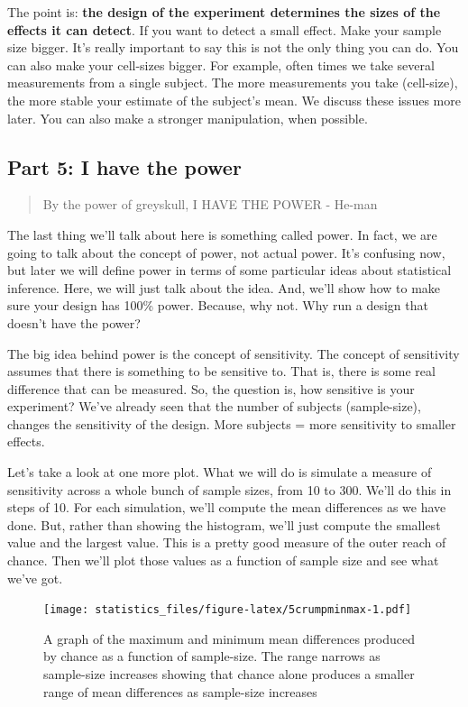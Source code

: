 \documentclass[]{book}
\begin{document}
The point is: \textbf{the design of the experiment determines the sizes of the effects it can detect}. If you want to detect a small effect. Make your sample size bigger. It's really important to say this is not the only thing you can do. You can also make your cell-sizes bigger. For example, often times we take several measurements from a single subject. The more measurements you take (cell-size), the more stable your estimate of the subject's mean. We discuss these issues more later. You can also make a stronger manipulation, when possible.

\hypertarget{part-5-i-have-the-power}{%
\subsection{Part 5: I have the power}\label{part-5-i-have-the-power}}

\begin{quote}
By the power of greyskull, I HAVE THE POWER - He-man
\end{quote}

The last thing we'll talk about here is something called power. In fact, we are going to talk about the concept of power, not actual power. It's confusing now, but later we will define power in terms of some particular ideas about statistical inference. Here, we will just talk about the idea. And, we'll show how to make sure your design has 100\% power. Because, why not. Why run a design that doesn't have the power?

The big idea behind power is the concept of sensitivity. The concept of sensitivity assumes that there is something to be sensitive to. That is, there is some real difference that can be measured. So, the question is, how sensitive is your experiment? We've already seen that the number of subjects (sample-size), changes the sensitivity of the design. More subjects = more sensitivity to smaller effects.

Let's take a look at one more plot. What we will do is simulate a measure of sensitivity across a whole bunch of sample sizes, from 10 to 300. We'll do this in steps of 10. For each simulation, we'll compute the mean differences as we have done. But, rather than showing the histogram, we'll just compute the smallest value and the largest value. This is a pretty good measure of the outer reach of chance. Then we'll plot those values as a function of sample size and see what we've got.

\begin{figure}
\centering
\texttt{[image: statistics\_files/figure-latex/5crumpminmax-1.pdf]}
\caption{\label{fig:5crumpminmax}A graph of the maximum and minimum mean differences produced by chance as a function of sample-size. The range narrows as sample-size increases showing that chance alone produces a smaller range of mean differences as sample-size increases}
\end{figure}
\end{document}
